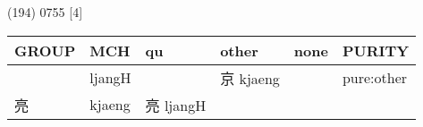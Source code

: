 \documentclass[14pt,a4paper]{scrartcl}
\begin{document}
(194) 0755 {[}4{]}

\begin{longtable}[c]{@{}llllll@{}}
\toprule
\begin{minipage}[b]{0.14\columnwidth}\raggedright\strut
GROUP
\strut\end{minipage} &
\begin{minipage}[b]{0.14\columnwidth}\raggedright\strut
MCH
\strut\end{minipage} &
\begin{minipage}[b]{0.14\columnwidth}\raggedright\strut
qu
\strut\end{minipage} &
\begin{minipage}[b]{0.14\columnwidth}\raggedright\strut
other
\strut\end{minipage} &
\begin{minipage}[b]{0.14\columnwidth}\raggedright\strut
none
\strut\end{minipage} &
\begin{minipage}[b]{0.14\columnwidth}\raggedright\strut
PURITY
\strut\end{minipage}\tabularnewline
\midrule
\endhead
\begin{minipage}[t]{0.14\columnwidth}\raggedright\strut
𢂋
\strut\end{minipage} &
\begin{minipage}[t]{0.14\columnwidth}\raggedright\strut
ljangH
\strut\end{minipage} &
\begin{minipage}[t]{0.14\columnwidth}\raggedright\strut
\strut\end{minipage} &
\begin{minipage}[t]{0.14\columnwidth}\raggedright\strut
京 kjaeng
\strut\end{minipage} &
\begin{minipage}[t]{0.14\columnwidth}\raggedright\strut
\strut\end{minipage} &
\begin{minipage}[t]{0.14\columnwidth}\raggedright\strut
pure:other
\strut\end{minipage}\tabularnewline
\begin{minipage}[t]{0.14\columnwidth}\raggedright\strut
亮
\strut\end{minipage} &
\begin{minipage}[t]{0.14\columnwidth}\raggedright\strut
kjaeng
\strut\end{minipage} &
\begin{minipage}[t]{0.14\columnwidth}\raggedright\strut
亮 ljangH
\strut\end{minipage} &

\end{longtable}
\end{document}
